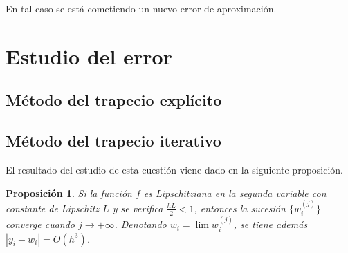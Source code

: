 \documentclass{article}
\theoremstyle{theorem-style}  %
\newtheorem{proposition}[theorem]{Proposición}
\theoremstyle{definition}
\theoremstyle{example-style}
\begin{document}
		En tal caso se está cometiendo un nuevo error de aproximación.



\section{Estudio del error}

	\subsection{Método del trapecio explícito}
	
	\subsection{Método del trapecio iterativo} \label{sec:error:iterativo}

		El resultado del estudio de esta cuestión viene dado en la siguiente proposición.
		
		\begin{proposition}
			Si la función $f$ es Lipschitziana en la segunda variable con constante de Lipschitz $L$ y se verifica $\frac{hL}{2} < 1$, entonces la sucesión $\{w_i^{(j)}\}$ converge cuando $j \rightarrow +\infty$. Denotando $w_i = \lim w_i^{(j)}$, se tiene además $\left|y_{i} - w_{i}\right| = O(h^3)$.
		\end{proposition}
		
\end{document}
